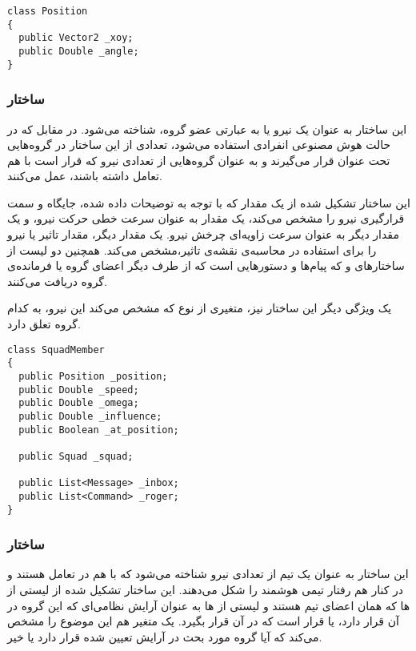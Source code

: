 \begin{latin}
{\linespread{1.2}
{\inconsolata
\lstset{language=Java}
\begin{lstlisting}
class Position
{
  public Vector2 _xoy;
  public Double _angle;
}
\end{lstlisting}
}
}
\end{latin}

\subsubsection{ساختار }
این ساختار به عنوان یک نیرو یا به عبارتی عضو گروه، شناخته می‌شود. در مقابل  که در حالت هوش مصنوعی
انفرادی استفاده می‌شود، تعدادی از این ساختار در گروه‌هایی تحت عنوان  قرار می‌گیرند و به عنوان
گروه‌هایی از تعدادی نیرو که قرار است با هم تعامل داشته باشند، عمل می‌کنند.

این ساختار تشکیل شده از
یک مقدار  که با توجه به توضیحات داده شده، جایگاه و سمت قرارگیری نیرو را مشخص می‌کند،
یک مقدار  به عنوان سرعت خطی حرکت نیرو، و یک مقدار  دیگر به عنوان سرعت زاویه‌ای چرخش نیرو.
یک مقدار  دیگر، مقدار تاثیر یا  نیرو را برای استفاده در محاسبه‌ی نقشه‌ی تاثیر،‌مشخص می‌کند.
همچنین دو لیست از ساختارهای  و  که پیام‌ها و دستورهایی است که از طرف دیگر اعضای گروه
یا فرمانده‌ی گروه دریافت می‌کنند.

یک ویژگی دیگر این ساختار نیز، متغیری از نوع  که مشخص می‌کند این نیرو، به کدام گروه تعلق دارد.
\begin{latin}
{\linespread{1.2}
{\inconsolata
\lstset{language=Java}
\begin{lstlisting}
class SquadMember
{
  public Position _position;
  public Double _speed;
  public Double _omega;
  public Double _influence;
  public Boolean _at_position;
  
  public Squad _squad;
  
  public List<Message> _inbox;
  public List<Command> _roger;
}
\end{lstlisting}
}
}
\end{latin}

\subsubsection{ساختار }
این ساختار به عنوان یک تیم از تعدادی نیرو شناخته می‌شود که با هم در تعامل هستند و در کنار هم رفتار تیمی
هوشمند را شکل می‌دهند. این ساختار تشکیل شده از لیستی از ها که همان اعضای تیم هستند و
لیستی از ها به عنوان آرایش نظامی‌ای که این گروه در آن قرار دارد، یا قرار است که در آن قرار بگیرد.
یک متغیر  هم این موضوع را مشخص می‌کند که آیا گروه مورد بحث در آرایش تعیین شده قرار دارد یا خیر.

